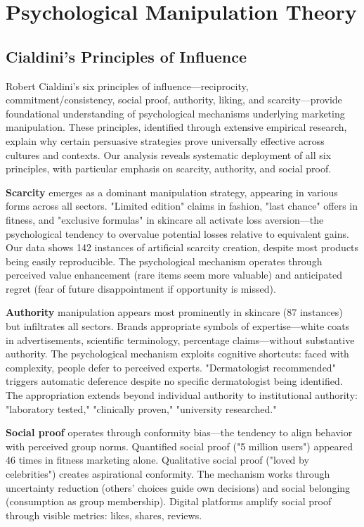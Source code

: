 \section{Psychological Manipulation Theory}
\label{sec:psych_theory}

\subsection{Cialdini's Principles of Influence}

Robert Cialdini's six principles of influence—reciprocity, commitment/consistency, social proof, authority, liking, and scarcity—provide foundational understanding of psychological mechanisms underlying marketing manipulation. These principles, identified through extensive empirical research, explain why certain persuasive strategies prove universally effective across cultures and contexts. Our analysis reveals systematic deployment of all six principles, with particular emphasis on scarcity, authority, and social proof.

\textbf{Scarcity} emerges as a dominant manipulation strategy, appearing in various forms across all sectors. "Limited edition" claims in fashion, "last chance" offers in fitness, and "exclusive formulas" in skincare all activate loss aversion—the psychological tendency to overvalue potential losses relative to equivalent gains. Our data shows 142 instances of artificial scarcity creation, despite most products being easily reproducible. The psychological mechanism operates through perceived value enhancement (rare items seem more valuable) and anticipated regret (fear of future disappointment if opportunity is missed).

\textbf{Authority} manipulation appears most prominently in skincare (87 instances) but infiltrates all sectors. Brands appropriate symbols of expertise—white coats in advertisements, scientific terminology, percentage claims—without substantive authority. The psychological mechanism exploits cognitive shortcuts: faced with complexity, people defer to perceived experts. "Dermatologist recommended" triggers automatic deference despite no specific dermatologist being identified. The appropriation extends beyond individual authority to institutional authority: "laboratory tested," "clinically proven," "university researched."

\textbf{Social proof} operates through conformity bias—the tendency to align behavior with perceived group norms. Quantified social proof ("5 million users") appeared 46 times in fitness marketing alone. Qualitative social proof ("loved by celebrities") creates aspirational conformity. The mechanism works through uncertainty reduction (others' choices guide own decisions) and social belonging (consumption as group membership). Digital platforms amplify social proof through visible metrics: likes, shares, reviews.

